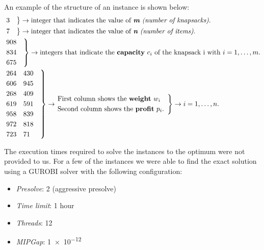 An example of the structure of an instance is shown below:
\[
    \begin{split}
        &\begin{rcases*}
             3 \quad
        \end{rcases*}
        \rightarrow \text{integer that indicates the value of \textit{\textbf{m} (number of knapsacks)}.}\\
        &\begin{rcases*}
             7 \quad
        \end{rcases*}
        \rightarrow \text{integer that indicates the value of \textit{\textbf{n} (number of items)}.}\\
        &\begin{rcases*}
             908 \quad\\
             834\\
             675\\
        \end{rcases*}
        \rightarrow \text{integers that indicate the \textbf{capacity} } c_{i} \text{ of the knapsack i with }
        \space i=1,\dots,m.\\
        &\begin{rcases*}
             264    \quad 430 \quad\\
             606 \quad    945\\
             268 \quad    409\\
             619 \quad    591\\
             958 \quad    839\\
             972 \quad    818\\
             723 \quad    71\\
        \end{rcases*}
        \rightarrow
        \begin{rcases*}
            \text{First column shows the \textbf{weight} } w_{i} \quad \\
            \text{Second column shows the \textbf{profit} } p_{i}.
        \end{rcases*}
        \rightarrow
        \space i=1,\dots,n.
    \end{split}
\]

The execution times required to solve the instances to the optimum were not provided to us.
For a few of the instances we were able to find the exact solution
using a GUROBI solver with the following configuration:

\begin{itemize}
    \item \textit{Presolve}: 2 (aggressive presolve)
    \item \textit{Time limit}: 1 hour
    \item \textit{Threads}: 12
    \item \textit{MIPGap}: \num{1e-12}
\end{itemize}

